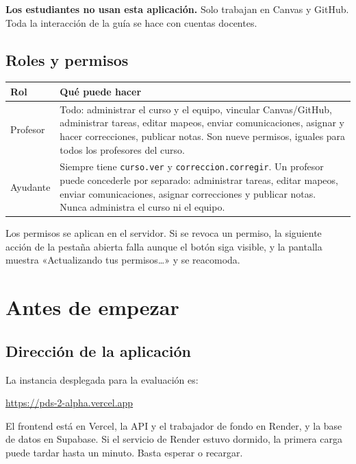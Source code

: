 \documentclass[11pt,a4paper]{article}
\begin{document}
\textbf{Los estudiantes no usan esta aplicación.} Solo trabajan en Canvas y GitHub. Toda la interacción de la guía se hace con cuentas docentes.

\subsection{Roles y permisos}

\noindent\begin{tabularx}{\textwidth}{L{3.2cm} X}
\toprule
\textbf{Rol} & \textbf{Qué puede hacer} \\
\midrule
Profesor & Todo: administrar el curso y el equipo, vincular Canvas/GitHub, administrar tareas, editar mapeos, enviar comunicaciones, asignar y hacer correcciones, publicar notas. Son nueve permisos, iguales para todos los profesores del curso. \\
Ayudante & Siempre tiene \texttt{curso.ver} y \texttt{correccion.corregir}. Un profesor puede concederle por separado: administrar tareas, editar mapeos, enviar comunicaciones, asignar correcciones y publicar notas. Nunca administra el curso ni el equipo. \\
\bottomrule
\end{tabularx}

\vspace{4pt}
Los permisos se aplican en el servidor. Si se revoca un permiso, la siguiente acción de la pestaña abierta falla aunque el botón siga visible, y la pantalla muestra «Actualizando tus permisos…» y se reacomoda.

\section{Antes de empezar}

\subsection{Dirección de la aplicación}

La instancia desplegada para la evaluación es:

\begin{center}
\large\url{https://pds-2-alpha.vercel.app}
\end{center}

El frontend está en Vercel, la API y el trabajador de fondo en Render, y la base de datos en Supabase. Si el servicio de Render estuvo dormido, la primera carga puede tardar hasta un minuto. Basta esperar o recargar.
\end{document}

